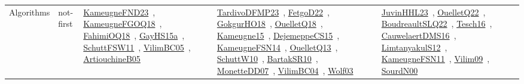 {\begin{longtable}{lp{3cm}>{\raggedright\arraybackslash}p{6cm}>{\raggedright\arraybackslash}p{6cm}>{\raggedright\arraybackslash}p{8cm}}
Algorithms & not-first & \href{works/KameugneFND23.pdf}{KameugneFND23}~\cite{KameugneFND23}, \href{works/KameugneFGOQ18.pdf}{KameugneFGOQ18}~\cite{KameugneFGOQ18}, \href{works/FahimiOQ18.pdf}{FahimiOQ18}~\cite{FahimiOQ18}, \href{works/GayHS15a.pdf}{GayHS15a}~\cite{GayHS15a}, \href{works/SchuttFSW11.pdf}{SchuttFSW11}~\cite{SchuttFSW11}, \href{works/VilimBC05.pdf}{VilimBC05}~\cite{VilimBC05}, \href{works/ArtiouchineB05.pdf}{ArtiouchineB05}~\cite{ArtiouchineB05} & \href{works/TardivoDFMP23.pdf}{TardivoDFMP23}~\cite{TardivoDFMP23}, \href{works/FetgoD22.pdf}{FetgoD22}~\cite{FetgoD22}, \href{works/GokgurHO18.pdf}{GokgurHO18}~\cite{GokgurHO18}, \href{works/OuelletQ18.pdf}{OuelletQ18}~\cite{OuelletQ18}, \href{works/Kameugne15.pdf}{Kameugne15}~\cite{Kameugne15}, \href{works/DejemeppeCS15.pdf}{DejemeppeCS15}~\cite{DejemeppeCS15}, \href{works/KameugneFSN14.pdf}{KameugneFSN14}~\cite{KameugneFSN14}, \href{works/OuelletQ13.pdf}{OuelletQ13}~\cite{OuelletQ13}, \href{works/SchuttW10.pdf}{SchuttW10}~\cite{SchuttW10}, \href{works/BartakSR10.pdf}{BartakSR10}~\cite{BartakSR10}, \href{works/MonetteDD07.pdf}{MonetteDD07}~\cite{MonetteDD07}, \href{works/VilimBC04.pdf}{VilimBC04}~\cite{VilimBC04}, \href{works/Wolf03.pdf}{Wolf03}~\cite{Wolf03} & \href{works/JuvinHHL23.pdf}{JuvinHHL23}~\cite{JuvinHHL23}, \href{works/OuelletQ22.pdf}{OuelletQ22}~\cite{OuelletQ22}, \href{works/BoudreaultSLQ22.pdf}{BoudreaultSLQ22}~\cite{BoudreaultSLQ22}, \href{works/Tesch16.pdf}{Tesch16}~\cite{Tesch16}, \href{works/CauwelaertDMS16.pdf}{CauwelaertDMS16}~\cite{CauwelaertDMS16}, \href{works/LimtanyakulS12.pdf}{LimtanyakulS12}~\cite{LimtanyakulS12}, \href{works/KameugneFSN11.pdf}{KameugneFSN11}~\cite{KameugneFSN11}, \href{works/Vilim09.pdf}{Vilim09}~\cite{Vilim09}, \href{works/SourdN00.pdf}{SourdN00}~\cite{SourdN00}\\

\end{longtable}}
